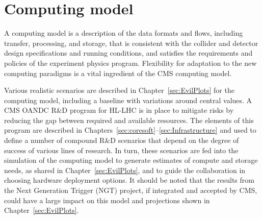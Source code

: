 


\clearpage

%
%
% 
\section{Computing model}
\label{sec:Model}

A computing model is a description of the data formats and flows, including transfer, processing, and storage, that is consistent with the collider and detector design specifications and running conditions, and satisfies the requirements and policies of the experiment physics program. Flexibility for adaptation to the new computing paradigms is a vital ingredient of the CMS \PhaseTwo computing model.

Various realistic scenarios are described in Chapter~\ref{sec:EvilPlots} for the computing model, including a baseline with variations around central values. A CMS \gls{OANDC} R\&D program for \gls{HL-LHC} is in place to mitigate risks by reducing the gap between required and available resources. The elements of this program are described in Chapters~\ref{sec:coresoft}--\ref{sec:Infrastructure} and used to define a number of compound R\&D scenarios that depend on the degree of success of various lines of research. In turn, these scenarios are fed into the simulation of the computing model to generate estimates of compute and storage needs, as shared in Chapter~\ref{sec:EvilPlots}, and to guide the collaboration in choosing hardware deployment options. It should be noted that the results from the Next Generation Trigger (NGT) project, if integrated and accepted by CMS, could have a large impact on this model and projections shown in Chapter~\ref{sec:EvilPlots}.

